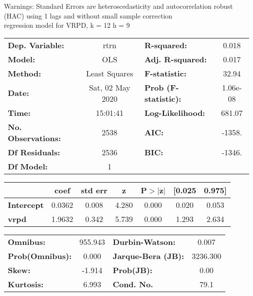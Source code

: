 Warnings: \newline
 [1] Standard Errors are heteroscedasticity and autocorrelation robust (HAC) using 1 lags and without small sample correction\\ 

regression model for VRPD, k = 12 h = 9\begin{center}
\begin{tabular}{lclc}
\toprule
\textbf{Dep. Variable:}    &       rtrn       & \textbf{  R-squared:         } &     0.018   \\
\textbf{Model:}            &       OLS        & \textbf{  Adj. R-squared:    } &     0.017   \\
\textbf{Method:}           &  Least Squares   & \textbf{  F-statistic:       } &     32.94   \\
\textbf{Date:}             & Sat, 02 May 2020 & \textbf{  Prob (F-statistic):} &  1.06e-08   \\
\textbf{Time:}             &     15:01:41     & \textbf{  Log-Likelihood:    } &    681.07   \\
\textbf{No. Observations:} &        2538      & \textbf{  AIC:               } &    -1358.   \\
\textbf{Df Residuals:}     &        2536      & \textbf{  BIC:               } &    -1346.   \\
\textbf{Df Model:}         &           1      & \textbf{                     } &             \\
\bottomrule
\end{tabular}
\begin{tabular}{lcccccc}
                   & \textbf{coef} & \textbf{std err} & \textbf{z} & \textbf{P$> |$z$|$} & \textbf{[0.025} & \textbf{0.975]}  \\
\midrule
\textbf{Intercept} &       0.0362  &        0.008     &     4.280  &         0.000        &        0.020    &        0.053     \\
\textbf{vrpd}      &       1.9632  &        0.342     &     5.739  &         0.000        &        1.293    &        2.634     \\
\bottomrule
\end{tabular}
\begin{tabular}{lclc}
\textbf{Omnibus:}       & 955.943 & \textbf{  Durbin-Watson:     } &    0.007  \\
\textbf{Prob(Omnibus):} &   0.000 & \textbf{  Jarque-Bera (JB):  } & 3236.300  \\
\textbf{Skew:}          &  -1.914 & \textbf{  Prob(JB):          } &     0.00  \\
\textbf{Kurtosis:}      &   6.993 & \textbf{  Cond. No.          } &     79.1  \\
\bottomrule
\end{tabular}
\end{center}

